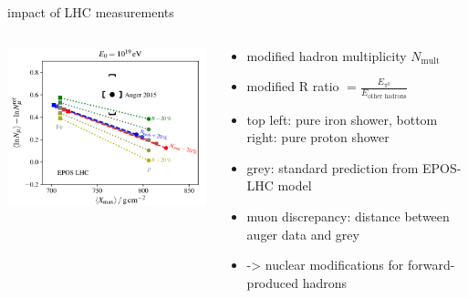 \documentclass[aspectratio=1610, 9pt]{beamer}
\begin{document}
\begin{frame}{impact of LHC measurements}
  \begin{columns}
    \begin{column}[c]{0.48\textwidth}
      \includegraphics{x_max_impact.png}
    \end{column}
    \begin{column}[c]{0.48\textwidth}
      \begin{itemize}
        \item modified hadron multiplicity $N_\text{mult}$
        \item modified R ratio $= \frac{E_{\pi^0}}{E_\text{other hadrons}}$
        \item top left: pure iron shower, bottom right: pure proton shower
        \item grey: standard prediction from EPOS-LHC model
        \item muon discrepancy: distance between auger data and grey
        \item -> nuclear modifications for forward-produced hadrons
      \end{itemize}
    \end{column}
  \end{columns}
\end{frame}
\end{document}
